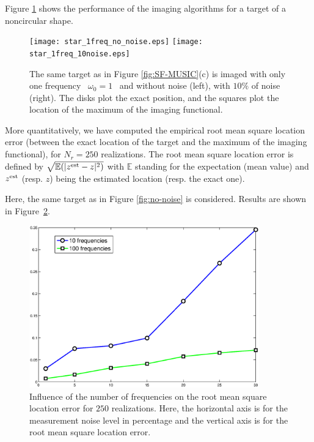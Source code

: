 \documentclass[final]{siamltex}
\def\EE{\mathbb{E}}
\numberwithin{equation}{section}
\numberwithin{figure}{section}
\numberwithin{table}{section}
\begin{document}
 Figure \ref{generalshape} shows the performance of the
imaging algorithms for a target of a noncircular shape.
\begin{figure}
\centering%
\texttt{[image: star\_1freq\_no\_noise.eps]} \hspace{0.2cm}
\texttt{[image: star\_1freq\_10noise.eps]} \hspace{0.2cm}
\tabularnewline
\caption{\label{generalshape} The same target as in Figure
\ref{fig:SF-MUSIC}(c) is imaged with  only one frequency
~$\omega_0=1$~ and without noise (left), with $10\%$ of noise
(right). The disks plot the exact position, and the squares plot
the location of the maximum of the imaging functional.
}
\end{figure}







More quantitatively, we have computed the empirical root mean
square location error (between the exact location of the target
and the maximum of the imaging functional), for $N_{r}=250$
realizations. The root mean square location error is defined by
$\sqrt{\EE(|{z}^{\rm est} - z|^2 )}$ with $\EE$ standing for the
expectation (mean value) and $z^{\rm est}$ (resp. $z$) being the
estimated location (resp. the exact one).

Here, the same target as in Figure \ref{fig:no-noise} is
considered. Results are shown in
Figure~\ref{fig:stats-freq-noise}.

\begin{figure}
\centering\includegraphics[height=7cm]{std_localization.eps}

\caption{\label{fig:stats-freq-noise}Influence of the number of
frequencies on the root mean square location error for $250$
realizations. Here, the horizontal axis is for the measurement
noise level in percentage and the vertical axis is for the root
mean square location error.}
\end{figure}
\end{document}
